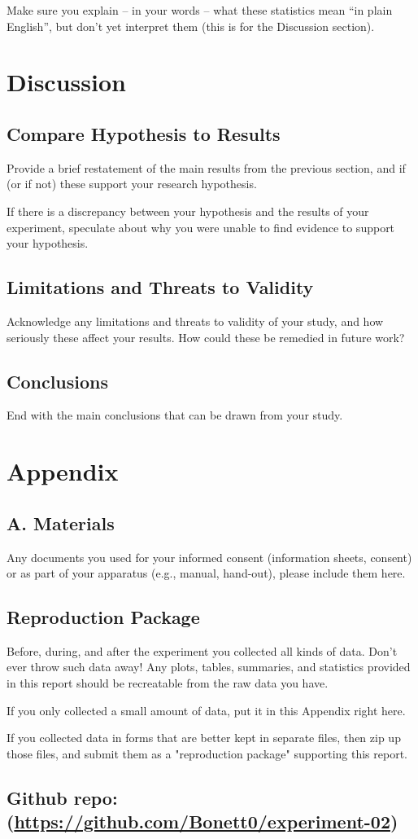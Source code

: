 \documentclass{article}
\begin{document}
Make sure you explain – in your words – what these statistics mean “in plain English”, but don’t yet interpret them (this is for the Discussion section).


\section{Discussion}
\subsection{Compare Hypothesis to Results}
Provide a brief restatement of the main results from the previous section, and if (or if not) these support your research hypothesis.

If there is a discrepancy between your hypothesis and the results of your experiment, speculate about why you were unable to find evidence to support your hypothesis.


\subsection{Limitations and Threats to Validity}Acknowledge any limitations and threats to validity of your study, and how seriously these affect your results. How could these be remedied in future work?

\subsection{Conclusions}

End with the main conclusions that can be drawn from your study.


\section{Appendix}
\subsection*{A. Materials}

Any documents you used for your informed consent (information sheets, consent) or as part of your apparatus (e.g., manual, hand-out), please include them here.

\subsection{Reproduction Package}

Before, during, and after the experiment you collected all kinds of data. Don't ever throw such data away! Any plots, tables, summaries, and statistics provided in this report should be recreatable from the raw data you have.

If you only collected a small amount of data, put it in this Appendix right here.

If you collected data in forms that are better kept in separate files, then zip up those files, and submit them as a "reproduction package" supporting this report.


\subsection*{{Github repo: (\url{https://github.com/Bonett0/experiment-02})}}
\end{document}
